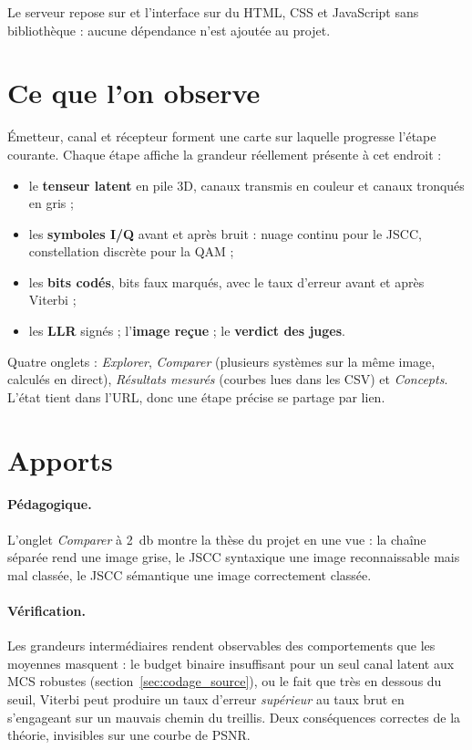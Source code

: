 Le serveur repose sur  et l'interface sur du HTML, CSS et JavaScript sans bibliothèque :
aucune dépendance n'est ajoutée au projet.

\section{Ce que l'on observe}
\label{sec:sim_vues}

Émetteur, canal et récepteur forment une carte sur laquelle progresse l'étape courante. Chaque étape affiche
la grandeur réellement présente à cet endroit :

\begin{itemize}
  \item le \textbf{tenseur latent} en pile 3D, canaux transmis en couleur et canaux tronqués en gris ;
  \item les \textbf{symboles I/Q} avant et après bruit : nuage continu pour le JSCC, constellation discrète
        pour la QAM ;
  \item les \textbf{bits codés}, bits faux marqués, avec le taux d'erreur avant et après Viterbi ;
  \item les \textbf{LLR} signés ; l'\textbf{image reçue} ; le \textbf{verdict des juges}.
\end{itemize}

Quatre onglets : \emph{Explorer}, \emph{Comparer} (plusieurs systèmes sur la même image, calculés en direct),
\emph{Résultats mesurés} (courbes lues dans les CSV) et \emph{Concepts}. L'état tient dans l'URL, donc une
étape précise se partage par lien.

\section{Apports}
\label{sec:sim_apport}

\paragraph{Pédagogique.} L'onglet \emph{Comparer} à \SI{2}{\decibel} montre la thèse du projet en une vue : la
chaîne séparée rend une image grise, le JSCC syntaxique une image reconnaissable mais mal classée, le JSCC
sémantique une image correctement classée.

\paragraph{Vérification.} Les grandeurs intermédiaires rendent observables des comportements que les moyennes
masquent : le budget binaire insuffisant pour un seul canal latent aux MCS robustes
(section~\ref{sec:codage_source}), ou le fait que très en dessous du seuil, Viterbi peut produire un taux
d'erreur \emph{supérieur} au taux brut en s'engageant sur un mauvais chemin du treillis. Deux conséquences
correctes de la théorie, invisibles sur une courbe de PSNR.
